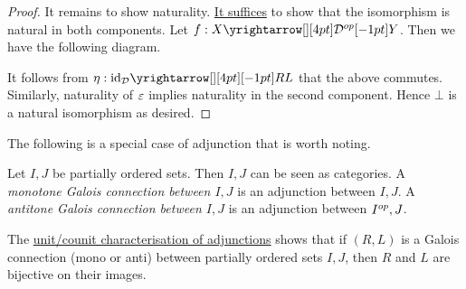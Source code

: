 \begin{proof}
  It remains to show naturality. 
  \hyperlink{nat_trans_prod_cat}{It suffices} to show that 
  the isomorphism is natural in both components. 
  Let $f : \map{X}{Y}{\DD\op}{}$. 
  Then we have the following diagram. 
  \begin{figure}[H]
    \centering
  \end{figure}
  It follows from $\eta : \map{\id{\DD}}{RL}{}{}$ that the above commutes.
  Similarly, naturality of $\varepsilon$ implies naturality in the second component. 
  Hence $\bot$ is a natural isomorphism as desired. 
\end{proof}

\begin{rmk}
  The following is a special case of adjunction that is worth noting. 
\end{rmk}
\begin{dfn}
  
  Let $I, J$ be partially ordered sets. 
  Then $I, J$ can be seen as categories. 
  A \emph{monotone Galois connection between $I,J$} is 
  an adjunction between $I, J$.
  A \emph{antitone Galois connection between $I,J$} is 
  an adjunction between $I^{op}, J$. 
\end{dfn}
\begin{rmk}
  The \hyperlink{unit_char_adj}{unit/counit characterisation of adjunctions}
  shows that if $(R,L)$ is a Galois connection (mono or anti) between 
  partially ordered sets $I,J$, 
  then $R$ and $L$ are bijective on their images. 
\end{rmk}

\begin{dfn}
  
\end{dfn}